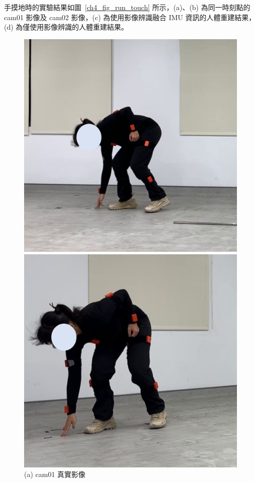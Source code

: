 \clearpage

手摸地時的實驗結果如圖~\ref{ch4_fig_run_touch} 所示，(a)、(b) 為同一時刻點的 cam01 影像及 cam02 影像，(c) 為使用影像辨識融合 IMU 資訊的人體重建結果，(d) 為僅使用影像辨識的人體重建結果。

\begin{figure}[!ht]
   \centering
   \begin{minipage}{.5\textwidth}
      \centering
      \includegraphics[width=.95\linewidth]{figure/ch4_fig_run_cam01_with3.jpg}
      \caption*{(a) cam01 真實影像}
    \end{minipage}%
    \begin{minipage}{.5\textwidth}
       \centering
       \includegraphics[width=.95\linewidth]{figure/ch4_fig_run_cam02_with3.jpg}

\end{minipage}
\end{figure}
